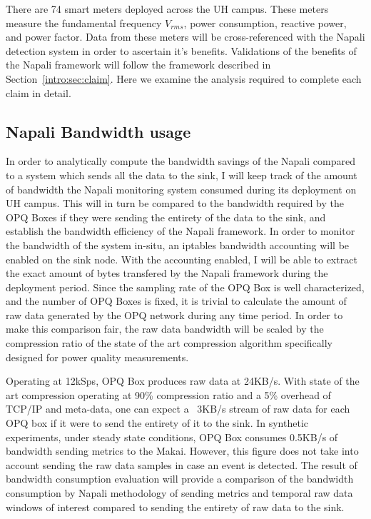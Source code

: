 There are 74 smart meters deployed across the UH campus.
These meters measure the fundamental frequency $V_{rms}$, power consumption, reactive power, and power factor.
Data from these meters will be cross-referenced with the Napali detection system in order to ascertain it's benefits.
Validations of the benefits of the Napali framework will follow the framework described in Section~\ref{intro:sec:claim}.
Here we examine the analysis required to complete each claim in detail.

\subsection{Napali Bandwidth usage} \label{iexp:sec:band}
In order to analytically compute the bandwidth savings of the Napali compared to a system which sends all the data to the sink, I will keep track of the amount of bandwidth the Napali monitoring system consumed during its deployment on UH campus.
This will in turn be compared to the bandwidth required by the OPQ Boxes if they were sending the entirety of the data to the sink, and establish the bandwidth efficiency of the Napali framework.
In order to monitor the bandwidth of the system in-situ, an iptables bandwidth accounting will be enabled on the sink node.
With the accounting enabled, I will be able to extract the exact amount of bytes transfered by the Napali framework during the deployment period.
Since the sampling rate of the OPQ Box is well characterized, and the number of OPQ Boxes is fixed, it is trivial to calculate the amount of raw data generated by the OPQ network during any time period.
In order to make this comparison fair, the raw data bandwidth will be scaled by the compression ratio of the state of the art compression algorithm specifically designed for power quality measurements.\cite{zhang2009new}

Operating at 12kSps, OPQ Box produces raw data at 24KB/s.
With state of the art compression operating at 90\% compression ratio and a 5\% overhead of TCP/IP and meta-data, one can expect a ~3KB/s stream of raw data for each OPQ box if it were to send the entirety of it to the sink.
In synthetic experiments, under steady state conditions, OPQ Box consumes 0.5KB/s of bandwidth sending metrics to the Makai.
However, this figure does not take into account sending the raw data samples in case an event is detected.
The result of bandwidth consumption evaluation will provide a comparison of the bandwidth consumption by Napali methodology of sending metrics and temporal raw data windows of interest compared to sending the entirety of raw data to the sink.

